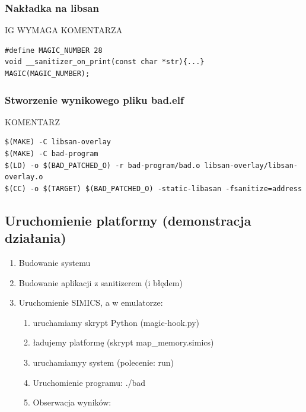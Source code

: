 \documentclass[../main.tex]{subfiles}
\begin{document}
\subsubsection{Nakładka na libsan}
IG WYMAGA KOMENTARZA
	\begin{listing}
	\begin{verbatim}
#define MAGIC_NUMBER 28
void __sanitizer_on_print(const char *str){...}
MAGIC(MAGIC_NUMBER);		
	\end{verbatim}
\end{listing}


\subsubsection{Stworzenie wynikowego pliku bad.elf}
KOMENTARZ
	\begin{listing}
	\begin{verbatim}
$(MAKE) -C libsan-overlay
$(MAKE) -C bad-program
$(LD) -o $(BAD_PATCHED_O) -r bad-program/bad.o libsan-overlay/libsan-overlay.o
$(CC) -o $(TARGET) $(BAD_PATCHED_O) -static-libasan -fsanitize=address
	\end{verbatim}
\end{listing}


\subsection{Uruchomienie platformy (demonstracja działania)}

\begin{enumerate}
	\item Budowanie systemu
	\item Budowanie aplikacji z sanitizerem (i błędem)
	
	\item Uruchomienie SIMICS, a w emulatorze:
	\begin{enumerate}
		\item uruchamiamy skrypt Python (magic-hook.py)
		
		\item ładujemy platformę (skrypt map\_memory.simics)
		\item uruchamiamyy system (polecenie: run)
		
		\item Uruchomienie programu: ./bad
		
		\item Obserwacja wyników:
		
	\end{enumerate}
\end{enumerate}
\end{document}
